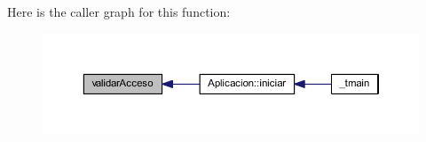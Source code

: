Here is the caller graph for this function\-:\nopagebreak
\begin{figure}[H]
\begin{center}
\leavevmode
\includegraphics[width=350pt]{_encriptador_8cpp_a514eeb9d37c47513308d43f3ddcb5d66_icgraph}
\end{center}
\end{figure}


